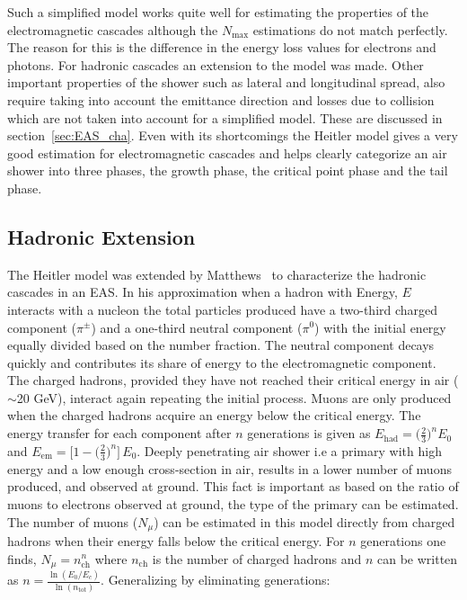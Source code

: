 Such a simplified model works quite well for estimating the properties of the electromagnetic cascades although the $N_{\text{max}}$ estimations do not match perfectly. The reason for this is the difference in the energy loss values for electrons and photons. For hadronic cascades an extension to the model was made. Other important properties of the shower such as lateral and longitudinal spread, also require taking into account the emittance direction and losses due to collision which are not taken into account for a simplified model. These are discussed in section~\ref{sec:EAS_cha}. Even with its shortcomings the Heitler model gives a very good estimation for electromagnetic cascades and helps clearly categorize an air shower into three phases, the growth phase, the critical point phase and the tail phase. 

\subsection{Hadronic Extension}
\label{sec:Dev_Had}
The Heitler model was extended by Matthews~\cite{MATTHEWS2005387} to characterize the hadronic cascades in an EAS. In his approximation when a hadron with Energy, $E$ interacts with a nucleon the total particles produced have a two-third charged component ($\pi^\pm $) and a one-third neutral component ($\pi^0$) with the initial energy equally divided based on the number fraction. The neutral component decays quickly and contributes its share of energy to the electromagnetic component. The charged hadrons, provided they have not reached their critical energy in air ($\sim$20 GeV), interact again repeating the initial process. Muons are only produced when the charged hadrons acquire an energy below the critical energy. The energy transfer for each component after $n$ generations is given as $E_{\text{had}} = \biggl(\frac{2}{3}\biggr)^n E_0$ and $E_{\text{em}} = \big[1- \biggl(  \frac{2}{3}\biggr)^n\big] \, E_0$. Deeply penetrating air shower i.e a primary with high energy and a low enough cross-section in air, results in a lower number of muons produced, and observed at ground. This fact is important as based on the ratio of muons to electrons observed at ground, the type of the primary can be estimated. The number of muons ($N_{\mu}$) can be estimated in this model directly from charged hadrons when their energy falls below the critical energy. For $n$ generations one finds, $N_{\mu} = n_{\text{ch}}^n$ where $n_{\text{ch}}$ is the number of charged hadrons and $n$ can be written as $n = \frac{\ln(E_0/E_c)}{\ln(n_{\text{tot}})}$. Generalizing by eliminating generations:

